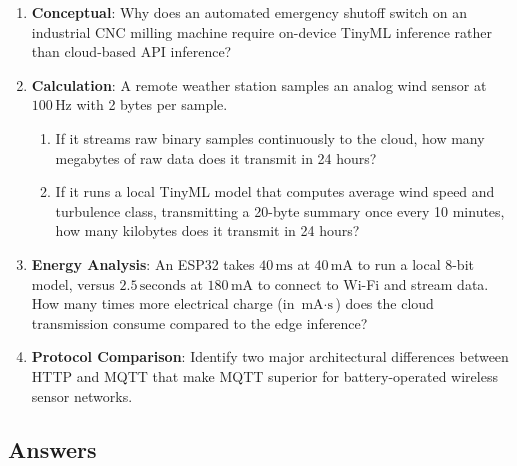 \begin{checkyourself}
\begin{enumerate}
    \item \textbf{Conceptual}: Why does an automated emergency shutoff switch on an industrial CNC milling machine require on-device TinyML inference rather than cloud-based API inference?
    \item \textbf{Calculation}: A remote weather station samples an analog wind sensor at $100\,\text{Hz}$ with 2 bytes per sample. 
    \begin{enumerate}
        \item If it streams raw binary samples continuously to the cloud, how many megabytes of raw data does it transmit in 24 hours?
        \item If it runs a local TinyML model that computes average wind speed and turbulence class, transmitting a 20-byte summary once every 10 minutes, how many kilobytes does it transmit in 24 hours?
    \end{enumerate}
    \item \textbf{Energy Analysis}: An ESP32 takes $40\,\text{ms}$ at $40\,\text{mA}$ to run a local 8-bit model, versus $2.5\,\text{seconds}$ at $180\,\text{mA}$ to connect to Wi-Fi and stream data. How many times more electrical charge (in $\text{mA}\cdot\text{s}$) does the cloud transmission consume compared to the edge inference?
    \item \textbf{Protocol Comparison}: Identify two major architectural differences between HTTP and MQTT that make MQTT superior for battery-operated wireless sensor networks.
\end{enumerate}
\end{checkyourself}

\subsection*{Answers}

